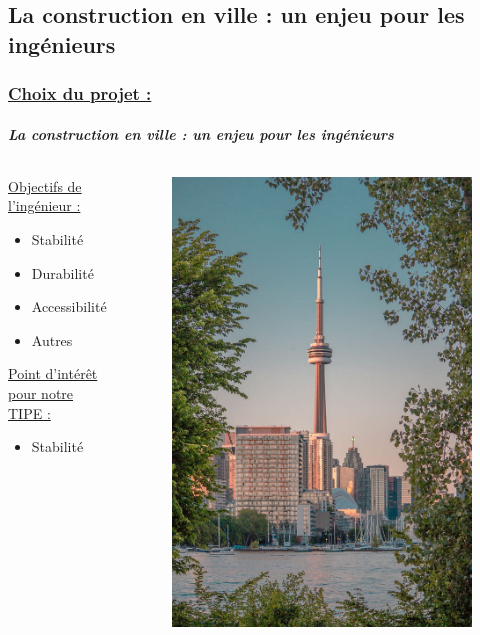 \documentclass[10pt]{beamer}
\begin{document}
	\subsection{La construction en ville : un enjeu pour les ing\'enieurs}
	\begin{frame}
		\frametitle{\uline{Choix du projet :}}
		\framesubtitle{\textit{La construction en ville : un enjeu pour les ing\'enieurs}}
		\begin{columns}[t]
  			\begin{column}{5cm} 
				\begin{block}{}
					\uline{Objectifs de l'ing\'enieur :}
  					\begin{itemize}
						\item Stabilit\'e
						\item Durabilit\'e
						\item Accessibilit\'e
						\item Autres
					\end{itemize}
					\uline{Point d'int\'er\^et pour notre TIPE :}
					\begin{itemize}
						\item Stabilit\'e
					\end{itemize}
				\end{block}
  			\end{column}
 			\begin{column}{5cm}
 				\begin{figure}
   					\includegraphics[scale = 0.125]{Images/city.png}

\end{figure}
\end{column}
\end{columns}
\end{frame}
\end{document}
